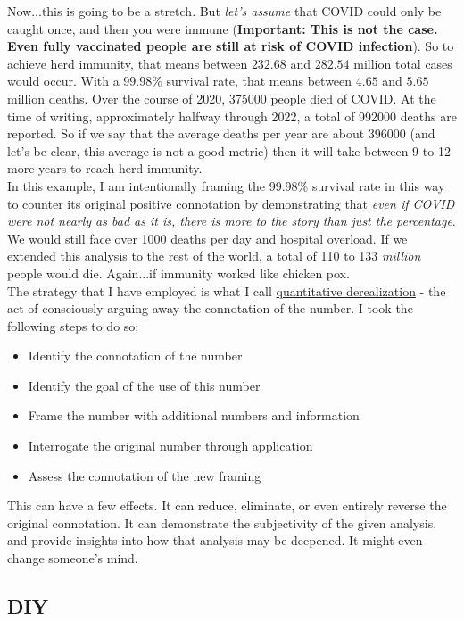 \documentclass{article}
\begin{document}
Now...this is going to be a stretch. But \textit{let's assume} that COVID could only be caught once, and then you were immune (\textbf{Important: This is not the case. Even fully vaccinated people are still at risk of COVID infection}). So to achieve herd immunity, that means between $232.68$ and $282.54$ million total cases would occur. With a $99.98\%$ survival rate, that means between $4.65$ and $5.65$ million deaths. Over the course of 2020, 375000 people died of COVID. At the time of writing, approximately halfway through 2022, a total of 992000 deaths are reported. So if we say that the average deaths per year are about 396000 (and let's be clear, this average is not a good metric) then it will take between 9 to 12 more years to reach herd immunity.\\

In this example, I am intentionally framing the 99.98\% survival rate in this way to counter its original positive connotation by demonstrating that \textit{even if COVID were not nearly as bad as it is, there is more to the story than just the percentage}. We would still face over 1000 deaths per day and hospital overload. If we extended this analysis to the rest of the world, a total of 110 to 133 \textit{million} people would die. Again...if immunity worked like chicken pox.\\

The strategy that I have employed is what I call \underline{quantitative derealization} - the act of consciously arguing away the connotation of the number. I took the following steps to do so:

\begin{itemize}
\item Identify the connotation of the number
\item Identify the goal of the use of this number
\item Frame the number with additional numbers and information
\item Interrogate the original number through application
\item Assess the connotation of the new framing
\end{itemize}

This can have a few effects. It can reduce, eliminate, or even entirely reverse the original connotation. It can demonstrate the subjectivity of the given analysis, and provide insights into how that analysis may be deepened. It might even change someone's mind.

\subsection*{DIY}
\end{document}
